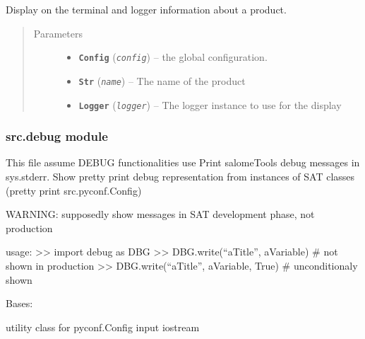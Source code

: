 \documentclass[a4paper,10pt,english]{sphinxmanual}
\begin{document}

\begin{fulllineitems}
\label{commands/apidoc/src:src.configManager.show_product_info}
Display on the terminal and logger information about a product.
\begin{quote}\begin{description}
\item[{Parameters}] \leavevmode\begin{itemize}
\item {} 
\textbf{\texttt{Config}} (\emph{\texttt{config}}) -- the global configuration.

\item {} 
\textbf{\texttt{Str}} (\emph{\texttt{name}}) -- The name of the product

\item {} 
\textbf{\texttt{Logger}} (\emph{\texttt{logger}}) -- The logger instance to use for the display

\end{itemize}

\end{description}\end{quote}

\end{fulllineitems}



\subsubsection{src.debug module}
\label{commands/apidoc/src:module-src.debug}\label{commands/apidoc/src:src-debug-module}
This file assume DEBUG functionalities use
Print salomeTools debug messages in sys.stderr.
Show pretty print debug representation from instances of SAT classes 
(pretty print src.pyconf.Config)

WARNING: supposedly show messages in SAT development phase, not production

usage:
\textgreater{}\textgreater{} import debug as DBG
\textgreater{}\textgreater{} DBG.write(``aTitle'', aVariable)        \# not shown in production 
\textgreater{}\textgreater{} DBG.write(``aTitle'', aVariable, True)  \# unconditionaly shown

\begin{fulllineitems}
\label{commands/apidoc/src:src.debug.InStream}
Bases: 

utility class for pyconf.Config input iostream

\end{fulllineitems}
\end{document}
